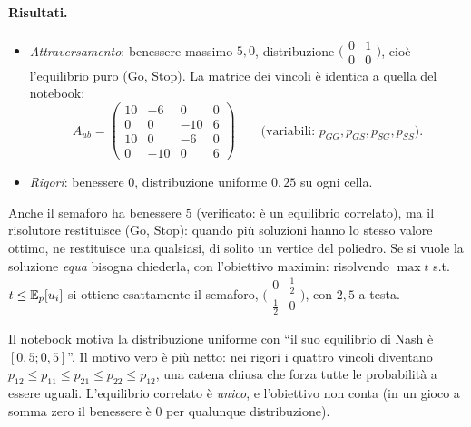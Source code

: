 \paragraph{Risultati.}
\begin{itemize}
  \item \emph{Attraversamento}: benessere massimo $5{,}0$, distribuzione
        $\bigl(\begin{smallmatrix}0&1\\0&0\end{smallmatrix}\bigr)$, cioè l'equilibrio puro
        (Go, Stop). La matrice dei vincoli è identica a quella del notebook:
        \[
          A_{ub} = \begin{pmatrix}
            10 & -6 & 0 & 0\\ 0 & 0 & -10 & 6\\ 10 & 0 & -6 & 0\\ 0 & -10 & 0 & 6
          \end{pmatrix}
          \qquad\text{(variabili: } p_{GG}, p_{GS}, p_{SG}, p_{SS}\text{)}.
        \]
  \item \emph{Rigori}: benessere $0$, distribuzione uniforme $0{,}25$ su ogni cella.
\end{itemize}

\begin{osservazione}
Anche il semaforo ha benessere $5$ (verificato: è un equilibrio correlato), ma il risolutore
restituisce (Go, Stop): quando più soluzioni hanno lo stesso valore ottimo, ne restituisce
una qualsiasi, di solito un vertice del poliedro. Se si vuole la soluzione \emph{equa}
bisogna chiederla, con l'obiettivo maximin: risolvendo $\max t$ s.t.\
$t \le \mathbb{E}_p[u_i]$ si ottiene esattamente il semaforo,
$\bigl(\begin{smallmatrix}0&\frac12\\\frac12&0\end{smallmatrix}\bigr)$, con $2{,}5$ a testa.
\end{osservazione}

\begin{osservazione}
Il notebook motiva la distribuzione uniforme con ``il suo equilibrio di Nash è
$[0{,}5; 0{,}5]$''. Il motivo vero è più netto: nei rigori i quattro vincoli diventano
$p_{12} \le p_{11} \le p_{21} \le p_{22} \le p_{12}$, una catena chiusa che forza tutte le
probabilità a essere uguali. L'equilibrio correlato è \emph{unico}, e l'obiettivo non conta
(in un gioco a somma zero il benessere è $0$ per qualunque distribuzione).
\end{osservazione}

